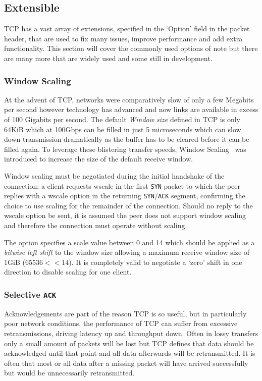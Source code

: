\documentclass[11pt,a4paper,british]{bhamarticle}
\begin{document}
\begin{multicols}{2}
\subsection{Extensible}
TCP has a vast array of extensions, specified in the `Option' field in the packet header, that are used to fix many issues, improve performance and add extra functionality. This section will cover the commonly used options of note but there are many more that are widely used and some still in development.

\subsubsection{Window Scaling}
At the advent of TCP, networks were comparatively slow of only a few Megabits per second however technology has advanced and now links are available in excess of 100 Gigabits per second. The default \textit{Window size} defined in TCP is only 64KiB which at 100Gbps can be filled in just 5 microseconds which can slow down transmission dramatically as the buffer has to be cleared before it can be filled again. To leverage these blistering transfer speeds, Window Scaling~\cite[2]{rfc1323} was introduced to increase the size of the default receive window. 

Window scaling must be negotiated during the initial handshake of the connection; a client requests wscale in the first \texttt{SYN} packet to which the peer replies with a wscale option in the returning \texttt{SYN}/\texttt{ACK} segment, confirming the choice to use scaling for the remainder of the connection. Should no reply to the wscale option be sent, it is assumed the peer does not support window scaling and therefore the connection must operate without scaling.

The option specifies a scale value between 0 and 14 which should be applied as a \textit{bitwise left shift} to the window size allowing a maximum receive window size of 1GiB ($65536 << 14$). It is completely valid to negotiate a `zero' shift in one direction to disable scaling for one client.

\subsubsection{Selective \texttt{ACK}}\label{sec:sack}
Acknowledgements are part of the reason TCP is so useful, but in particularly poor network conditions, the performance of TCP can suffer from excessive retransmissions, driving latency up and throughput down. Often in lossy transfers only a small amount of packets will be lost but TCP defines that data should be acknowledged until that point and all data afterwards will be retransmitted. It is often that most or all data after a missing packet will have arrived successfully but would be unnecessarily retransmitted.


\end{multicols}
\end{document}
